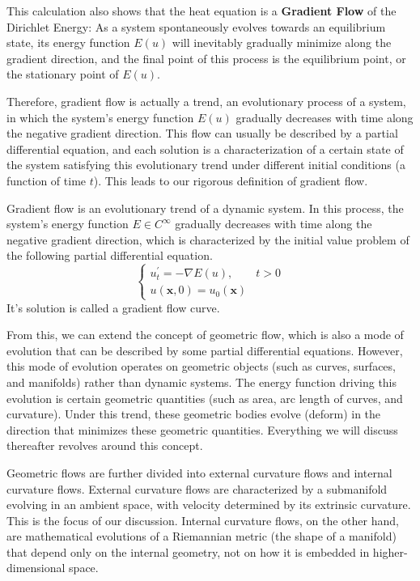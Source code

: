 This calculation also shows that the heat equation is a \textbf{Gradient Flow} of the Dirichlet Energy: As a system spontaneously evolves towards an equilibrium state, its energy function $E(u)$ will inevitably gradually minimize along the gradient direction, and the final point of this process is the equilibrium point, or the stationary point of $E(u)$.

Therefore, gradient flow is actually a trend, an evolutionary process of a system, in which the system's energy function $E(u)$ gradually decreases with time along the negative gradient direction. This flow can usually be described by a partial differential equation, and each solution is a characterization of a certain state of the system satisfying this evolutionary trend under different initial conditions (a function of time $t$). This leads to our rigorous definition of gradient flow.

\begin{definition}\label{def:Gradient Flow}
    Gradient flow is an evolutionary trend of a dynamic system. In this process, the system's energy function $E\in C^\infty$ gradually decreases with time along the negative gradient direction, which is characterized by the initial value problem of the following partial differential equation.
    \begin{equation}
        \begin{cases}
            u^\prime_t=-\nabla E(u), &t>0\\
            u(\boldsymbol{x},0)=u_0(\boldsymbol{x})
        \end{cases}
    \end{equation}
    It's solution is called a gradient flow curve.
\end{definition}

From this, we can extend the concept of geometric flow, which is also a mode of evolution that can be described by some partial differential equations. However, this mode of evolution operates on geometric objects (such as curves, surfaces, and manifolds) rather than dynamic systems. The energy function driving this evolution is certain geometric quantities (such as area, arc length of curves, and curvature). Under this trend, these geometric bodies evolve (deform) in the direction that minimizes these geometric quantities. Everything we will discuss thereafter revolves around this concept.

Geometric flows are further divided into external curvature flows and internal curvature flows. External curvature flows are characterized by a submanifold evolving in an ambient space, with velocity determined by its extrinsic curvature. This is the focus of our discussion. Internal curvature flows, on the other hand, are mathematical evolutions of a Riemannian metric (the shape of a manifold) that depend only on the internal geometry, not on how it is embedded in higher-dimensional space.
